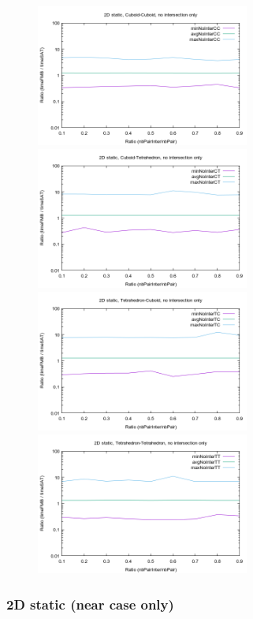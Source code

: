 \documentclass[12pt, a4paper]{article}
\begin{document}
\begin{center}
\begin{figure}[H]
\centering\includegraphics[width=7cm]{../Results/qualification2DCCnointer.png}
\centering\includegraphics[width=7cm]{../Results/qualification2DCTnointer.png}
\centering\includegraphics[width=7cm]{../Results/qualification2DTCnointer.png}
\centering\includegraphics[width=7cm]{../Results/qualification2DTTnointer.png}
\end{figure}
\end{center}

\subsubsection{2D static (near case only)}
\end{document}
